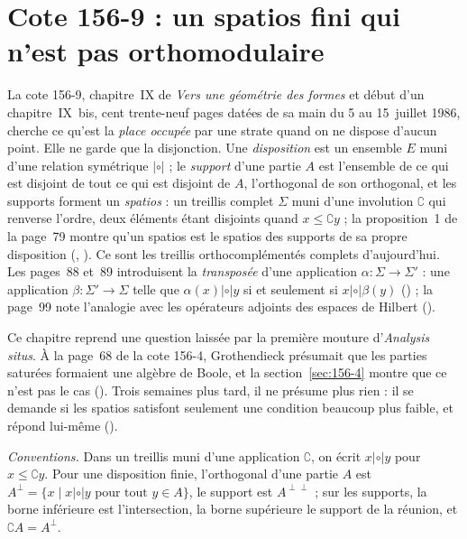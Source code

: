\section[Cote 156-9 : un spatios fini qui n'est pas orthomodulaire]{Cote 156-9 : un spatios fini qui n'est pas orthomodulaire\protect{}}\label{sec:156-9}

La cote 156-9, chapitre~IX de \emph{Vers une géométrie des formes} et début d'un chapitre~IX~bis, cent trente-neuf pages datées de sa main du 5 au 15~juillet 1986, cherche ce qu'est la \emph{place occupée} par une strate quand on ne dispose d'aucun point. Elle ne garde que la disjonction. Une \emph{disposition} est un ensemble $E$ muni d'une relation symétrique $\mathrel{|\circ|}$ ; le \emph{support} d'une partie $A$ est l'ensemble de ce qui est disjoint de tout ce qui est disjoint de $A$, l'orthogonal de son orthogonal, et les supports forment un \emph{spatios} : un treillis complet $\Sigma$ muni d'une involution $\complement$ qui renverse l'ordre, deux éléments étant disjoints quand $x \leq \complement y$ ; la proposition~1 de la page~79 montre qu'un spatios est le spatios des supports de sa propre disposition (, ). Ce sont les treillis orthocomplémentés complets d'aujourd'hui. Les pages~88 et~89 introduisent la \emph{transposée} d'une application $\alpha : \Sigma \to \Sigma'$ : une application $\beta : \Sigma' \to \Sigma$ telle que $\alpha(x) \mathrel{|\circ|} y$ si et seulement si $x \mathrel{|\circ|} \beta(y)$ () ; la page~99 note l'analogie avec les opérateurs adjoints des espaces de Hilbert ().

Ce chapitre reprend une question laissée par la première mouture d'\emph{Analysis situs}. À la page~68 de la cote 156-4, Grothendieck présumait que les parties saturées formaient une algèbre de Boole, et la section~\ref{sec:156-4} montre que ce n'est pas le cas (). Trois semaines plus tard, il ne présume plus rien : il se demande si les spatios satisfont seulement une condition beaucoup plus faible, et répond lui-même  ().

\noindent\emph{Conventions.} Dans un treillis muni d'une application $\complement$, on écrit $x \mathrel{|\circ|} y$ pour $x \leq \complement y$. Pour une disposition finie, l'orthogonal d'une partie $A$ est $A^{\perp} = \{x \mid x \mathrel{|\circ|} y \text{ pour tout } y \in A\}$, le support est $A^{\perp\perp}$ ; sur les supports, la borne inférieure est l'intersection, la borne supérieure le support de la réunion, et $\complement A = A^{\perp}$.

